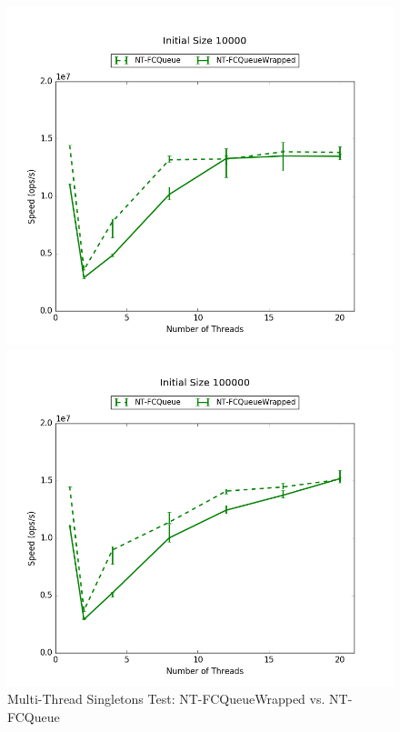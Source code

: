 \begin{figure}[H]
    \centering
	\begin{minipage}{0.5\textwidth}\includegraphics[width=\textwidth]{fcqueues/ntQ:RandSingleOps10000.png}
    \end{minipage}
	\begin{minipage}{0.45\textwidth}
    
    \end{minipage}
	\begin{minipage}{0.5\textwidth}\includegraphics[width=\textwidth]{fcqueues/ntQ:RandSingleOps100000.png}
    \end{minipage}
	\begin{minipage}{0.45\textwidth}
    
    \end{minipage}
\caption{Multi-Thread Singletons Test: NT-FCQueueWrapped vs. NT-FCQueue}
\label{fig:ntqueues}
\end{figure}

